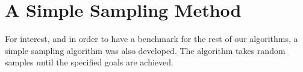 \section{A Simple Sampling Method}
For interest, and in order to have a benchmark for the rest of our algorithms, a simple sampling algorithm was also developed. The algorithm takes random samples until the specified goals are achieved.
